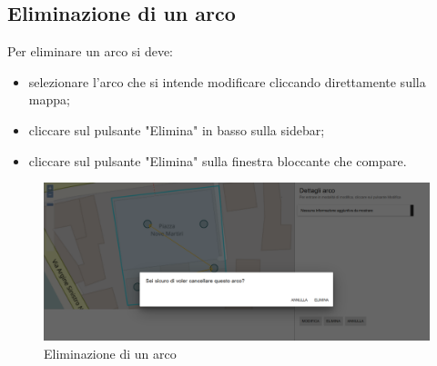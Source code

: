\subsection{Eliminazione di un arco}
Per eliminare un arco si deve:
\begin{itemize}
	\item selezionare l'arco che si intende modificare cliccando direttamente sulla mappa;
	\item cliccare sul pulsante "Elimina" in basso sulla sidebar;
	\item cliccare sul pulsante "Elimina" sulla finestra bloccante che compare.
\end{itemize}

\begin{figure}[H]
\centering
\includegraphics[width=\textwidth]{img/eliminazione_bloccante_arco.png}
\caption{Eliminazione di un arco}
\end{figure}